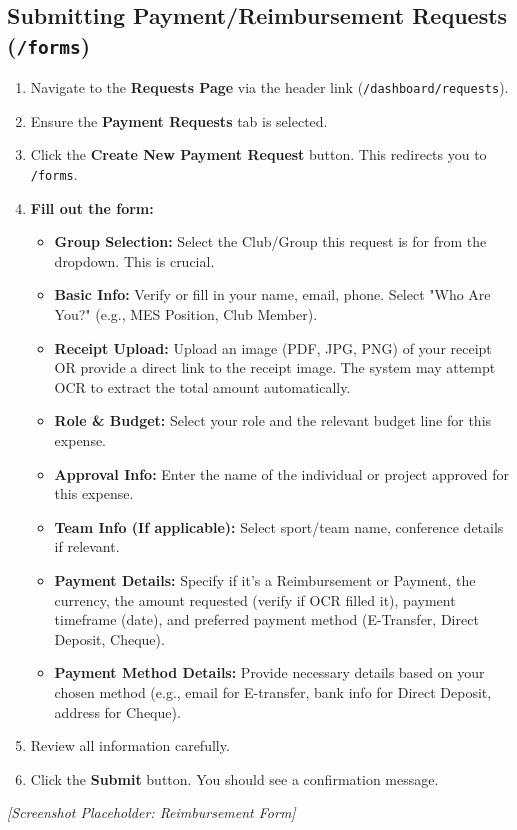 \documentclass{article}
\begin{document}
\subsection{Submitting Payment/Reimbursement Requests (\texttt{/forms})}
\begin{enumerate}
    \item Navigate to the \textbf{Requests Page} via the header link (\texttt{/dashboard/requests}).
    \item Ensure the \textbf{Payment Requests} tab is selected.
    \item Click the \textbf{Create New Payment Request} button. This redirects you to \texttt{/forms}.
    \item \textbf{Fill out the form:}
        \begin{itemize}
            \item \textbf{Group Selection:} Select the Club/Group this request is for from the dropdown. This is crucial.
            \item \textbf{Basic Info:} Verify or fill in your name, email, phone. Select "Who Are You?" (e.g., MES Position, Club Member).
            \item \textbf{Receipt Upload:} Upload an image (PDF, JPG, PNG) of your receipt OR provide a direct link to the receipt image. The system may attempt OCR to extract the total amount automatically.
            \item \textbf{Role \& Budget:} Select your role and the relevant budget line for this expense.
            \item \textbf{Approval Info:} Enter the name of the individual or project approved for this expense.
            \item \textbf{Team Info (If applicable):} Select sport/team name, conference details if relevant.
            \item \textbf{Payment Details:} Specify if it's a Reimbursement or Payment, the currency, the amount requested (verify if OCR filled it), payment timeframe (date), and preferred payment method (E-Transfer, Direct Deposit, Cheque).
            \item \textbf{Payment Method Details:} Provide necessary details based on your chosen method (e.g., email for E-transfer, bank info for Direct Deposit, address for Cheque).
        \end{itemize}
    \item Review all information carefully.
    \item Click the \textbf{Submit} button. You should see a confirmation message.
\end{enumerate}
\textit{[Screenshot Placeholder: Reimbursement Form]}
\end{document}
